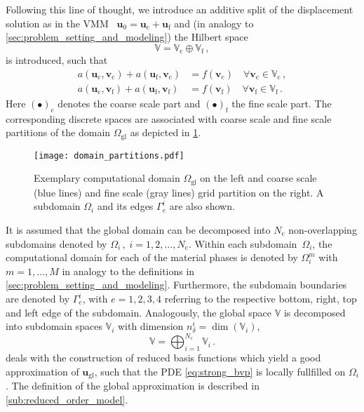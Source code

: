 \documentclass[AMA,STIX1COL,doublespace]{WileyNJD-v2}
\begin{document}
Following this line of thought, we introduce an additive split of the displacement solution as in the VMM~\cite{Hughes1995,HughesFeijooEtAl1998} $\bm{u}_{0} = \bm{u}_{\mathrm{c}} + \bm{u}_{\mathrm{f}}$ and (in analogy to \cref{sec:problem_setting_and_modeling}) the Hilbert space
\begin{equation}
	\label{eq:split}
	\mathbb{V} = \mathbb{V}_{\mathrm{c}} \oplus \mathbb{V}_{\mathrm{f}}\,,
\end{equation}
is introduced, such that
\begin{align}
    \label{eq:coarse-form}
    a({\bm{u}}_{\mathrm{c}}, \bm{v}_{\mathrm{c}}) + a(\bm{u}_{\mathrm{f}}, \bm{v}_{\mathrm{c}}) &= f(\bm{v}_{\mathrm{c}}) \quad\forall \bm{v}_{\mathrm{c}} \in\mathbb{V}_{\mathrm{c}}\,,\\
    \label{eq:fine-form}
    a({\bm{u}}_{\mathrm{c}}, \bm{v}_{\mathrm{f}}) + a(\bm{u}_{\mathrm{f}}, \bm{v}_{\mathrm{f}}) &= f(\bm{v}_{\mathrm{f}}) \quad\forall \bm{v}_{\mathrm{f}} \in\mathbb{V}_{\mathrm{f}}\,.
\end{align}
Here ${(\bullet)}_{\mathrm{c}}$ denotes the coarse scale part and ${(\bullet)}_{\mathrm{f}}$ the fine scale part. 
The corresponding discrete spaces are associated with coarse scale and fine scale partitions of the domain $\varOmega_{\mathrm{gl}}$ as depicted in \cref{fig:domain_partitions}.
\begin{figure}[tb]
	\centering
	\texttt{[image: domain\_partitions.pdf]}
	\caption{Exemplary computational domain $\varOmega_{\mathrm{gl}}$ on the left and coarse scale (blue lines) and fine scale (gray lines) grid partition on the right. A subdomain $\varOmega_i$ and its edges $\varGamma_e^i$ are also shown.}%
	\label{fig:domain_partitions}
\end{figure}
It is assumed that the global domain can be decomposed into $N_{\mathrm{c}}$ non-overlapping
subdomains denoted by $\varOmega_i\,,\; i=1, 2, \ldots, N_{\mathrm{c}}$.
Within each subdomain~$\varOmega_i$, the computational domain for each of the material phases is denoted by $\varOmega_i^m$ with $m=1, \ldots, M$ in analogy to the definitions in \cref{sec:problem_setting_and_modeling}.
Furthermore, the subdomain boundaries are denoted by $\varGamma^i_e$, with $e=1, 2, 3, 4$ referring to the respective bottom, right, top and left edge of the subdomain.
Analogously, the global space $\mathbb{V}$ is decomposed into subdomain spaces $\mathbb{V}_i$ with dimension $n^i_{{\delta}} = \dim(\mathbb{V}_i)$,
\begin{equation}
	\mathbb{V} = \bigoplus_{i=1}^{N_{\mathrm{c}}} \mathbb{V}_i\,.
\end{equation}
 deals with the construction of reduced basis functions which yield a good approximation of $\bm{u}_{\mathrm{gl}}$, such that the PDE \cref{eq:strong_bvp} is locally fullfilled on $\varOmega_i$.
The definition of the global approximation is described in \cref{sub:reduced_order_model}.
\end{document}
